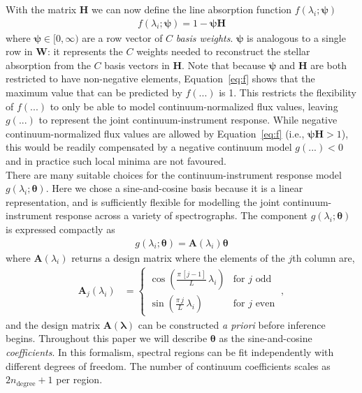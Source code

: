 \documentclass[modern]{aastex631}
\renewcommand{\vec}[1]{\mathbf{#1}}
\newcommand{\vectheta}{\boldsymbol{\theta}}
\newcommand{\vecpsi}{\boldsymbol{\psi}}
\newcommand{\vecW}{\mathbf{W}}
\newcommand{\vecH}{\mathbf{H}}
\begin{document}
\noindent{}With the matrix $\vec{H}$ we can now define the line absorption function $f(\lambda_i;\vecpsi)$ 
\begin{align}
    f(\lambda_i;\vecpsi) = 1 - \vecpsi\vecH \label{eq:f}
\end{align}
where $\vecpsi \in [0, \infty)$ are a row vector of $C$ \emph{basis weights}. $\vecpsi$ is analogous to a single row in $\vecW$: it represents the $C$ weights needed to reconstruct the stellar absorption from the $C$ basis vectors in $\vecH$. Note that because $\vecpsi$ and $\vecH$ are both restricted to have non-negative elements, Equation~\ref{eq:f} shows that the maximum value that can be predicted by $f(...)$ is 1. This restricts the flexibility of $f(...)$ to only be able to model continuum-normalized flux values, leaving $g(...)$ to represent the joint continuum-instrument response. While negative continuum-normalized flux values are allowed by Equation~\ref{eq:f} (i.e., $\vecpsi\vecH > 1$), this would be readily compensated by a negative continuum model $g(...) < 0$ and in practice such local minima are not favoured.\\

There are many suitable choices for the continuum-instrument response model $g(\lambda_i;\vectheta)$. Here we chose a sine-and-cosine basis because it is a linear representation, and is sufficiently flexible for modelling the joint continuum-instrument response across a variety of spectrographs. The component $g(\lambda_i;\vectheta)$ is expressed compactly as
\begin{align}
    g(\lambda_i;\vectheta) = \vec{A}(\lambda_i)\vectheta
\end{align}
where $\vec{A}(\lambda_i)$ returns a design matrix where the elements of the $j$th column are,
\begin{align}
    \vec{A}_{j}(\lambda_i) & = \left\{\begin{array}{cl}\displaystyle\cos\left(\frac{\pi\,[j-1]}{L}\,\lambda_i\right) & \mbox{for $j$ odd} \\[3ex]
                                       \displaystyle\sin\left(\frac{\pi\,j}{L}\,\lambda_i\right) & \mbox{for $j$ even}\end{array}\right. ~,
\end{align}
\noindent{}and the design matrix $\vec{A}(\vec{\lambda})$ can be constructed \emph{a priori} before inference begins. Throughout this paper we will describe $\vectheta$ as the sine-and-cosine \emph{coefficients}. In this formalism, spectral regions can be fit independently with different degrees of freedom. The number of continuum coefficients scales as $2n_\textrm{degree} + 1$ per region. 
\end{document}
